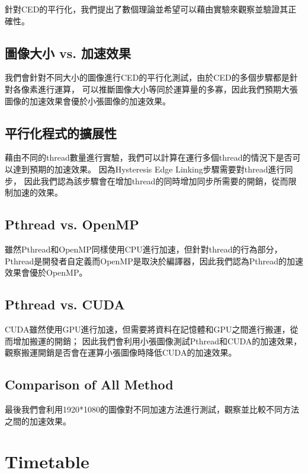 \documentclass[sigconf,nonacm]{acmart}
\begin{document}
針對CED的平行化，我們提出了數個理論並希望可以藉由實驗來觀察並驗證其正確性。

\subsection{圖像大小 vs. 加速效果}

我們會針對不同大小的圖像進行CED的平行化測試，由於CED的多個步驟都是針對各像素進行運算，
可以推斷圖像大小等同於運算量的多寡，因此我們預期大張圖像的加速效果會優於小張圖像的加速效果。

\subsection{平行化程式的擴展性}

藉由不同的thread數量進行實驗，我們可以計算在運行多個thread的情況下是否可以達到預期的加速效果。
因為Hysteresis Edge Linking步驟需要對thread進行同步，
因此我們認為該步驟會在增加thread的同時增加同步所需要的開銷，從而限制加速的效果。

\subsection{Pthread vs. OpenMP}

雖然Pthread和OpenMP同樣使用CPU進行加速，但針對thread的行為部分，
Pthread是開發者自定義而OpenMP是取決於編譯器，因此我們認為Pthread的加速效果會優於OpenMP。

\subsection{Pthread vs. CUDA}

CUDA雖然使用GPU進行加速，但需要將資料在記憶體和GPU之間進行搬運，從而增加搬運的開銷；
因此我們會利用小張圖像測試Pthread和CUDA的加速效果，
觀察搬運開銷是否會在運算小張圖像時降低CUDA的加速效果。

\subsection{Comparison of All Method}

最後我們會利用1920*1080的圖像對不同加速方法進行測試，觀察並比較不同方法之間的加速效果。

\section{Timetable}
\end{document}
